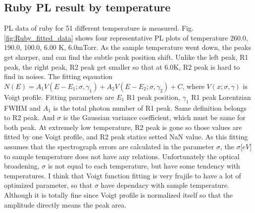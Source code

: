 \documentclass{article}
\begin{document}
\subsection{Ruby PL result by temperature}
\label{result:temperature_peak_statics}  
 PL data of ruby for 51 different temperature is measured.
 Fig. \ref{fig:Ruby_fitted_data} shows four representative PL plots of temperature 260.0, 190.0, 100.0, 6.00 K, 6.0mTorr.
 As the sample temperature went down, the peaks get sharper, and can find the subtle peak position shift.
 Unlike the left peak, R1 peak, the right peak, R2 peak get smaller so that at 6.0K, R2 peak is hard to find in noises.
 The fitting eqauation $N(E)=A_1 V(E-E_1;\sigma,\gamma_1) + A_2 V(E-E_2;\sigma,\gamma_2)+C$, where $V(x;\sigma,\gamma)$ is Voigt profile.
 Fitting parameters are $E_1$ R1 peak position, $\gamma_1$ R1 peak Lorentzian FWHM and $A_1$ is the total photon number of R1 peak.
 Same definition belongs to R2 peak.
 And $\sigma$ is the Gaussian variance coefficient, which must be same for both peak.
 At extremely low temperature, R2 peak is gone so those values are fitted by one Voigt profile, and R2 peak statics setted NaN value.
 As this fitting assumes that the spectrograph errors are calculated in the parameter $\sigma$, the $\sigma $[$eV$] to sample temperature does not have any relations.
 Unfortunately the optical broadening, $\sigma$ is not equal to each temperature, but have some tendency with temperatures.
 I think that Voigt function fitting is very frajile to have a lot of optimized parameter, so that $\sigma$ have dependacy with sample temperature.
 Although it is totally fine since Voigt profile is normalized itself so that the amplitude directly means the peak area.
\end{document}
